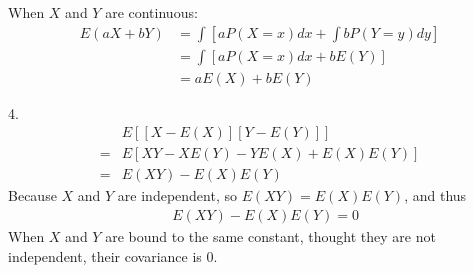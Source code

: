 \documentclass{article}
\begin{document}
When $X$ and $Y$ are continuous:
\begin{align*}
    E(aX+bY)&=\int\left[aP(X=x)dx+\int bP(Y=y)dy\right]\\
    &=\int\left[aP(X=x)dx+bE(Y)\right]\\
    &=aE(X)+bE(Y)
\end{align*}

4.
\begin{align*}
    &E\left[\left[X-E(X)\right]\left[Y-E(Y)\right]\right]\\
    =&E\left[XY-XE(Y)-YE(X)+E(X)E(Y)\right]\\
    =&E(XY)-E(X)E(Y)
\end{align*}
Because $X$ and $Y$ are independent, so $E(XY)=E(X)E(Y)$, and thus
\begin{align*}
    &E(XY)-E(X)E(Y)=0
\end{align*}
When $X$ and $Y$ are bound to the same constant, thought they are not independent, their covariance is 0.
\end{document}
